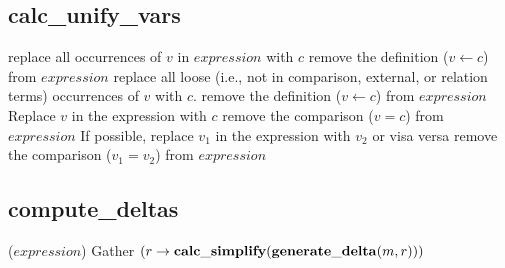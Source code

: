 \documentclass[11pt]{amsart}
\begin{document}
\subsection{calc\_unify\_vars}
\begin{algorithmic}
    \STATE replace all occurrences of $v$ in $expression$ with $c$
    \STATE remove the definition ($v \leftarrow c$) from $expression$
  \ENDIF
  \STATE replace all loose (i.e., not in comparison, external, or relation terms) occurrences of $v$ with $c$.
    \STATE remove the definition ($v \leftarrow c$) from $expression$
  \ENDIF
\ENDFOR
{}
  \STATE Replace $v$ in the expression with $c$
  \STATE remove the comparison ($v = c$) from $expression$
\ENDFOR
{}
  \STATE If possible, replace $v_1$ in the expression with $v_2$ or visa versa
  \STATE remove the comparison ($v_1 = v_2$) from $expression$
\ENDFOR
\end{algorithmic}

\subsection{compute\_deltas}
\begin{algorithmic}
($expression$)
    \STATE Gather $(r \rightarrow {\bf calc\_simplify}({\bf generate\_delta}(m, r)))$
  \ENDFOR
\ENDFOR
\end{algorithmic}
\end{document}
